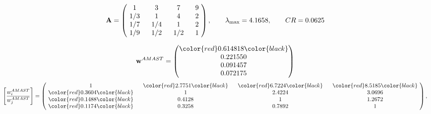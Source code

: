 \begin{example}
\begin{equation*}
\mathbf{A} =
\begin{pmatrix}
$\,\,$ 1 $\,\,$ & $\,\,$3$\,\,$ & $\,\,$7$\,\,$ & $\,\,$9 $\,\,$ \\
$\,\,$ 1/3$\,\,$ & $\,\,$ 1 $\,\,$ & $\,\,$4$\,\,$ & $\,\,$2 $\,\,$ \\
$\,\,$ 1/7$\,\,$ & $\,\,$ 1/4$\,\,$ & $\,\,$ 1 $\,\,$ & $\,\,$2 $\,\,$ \\
$\,\,$ 1/9$\,\,$ & $\,\,$ 1/2$\,\,$ & $\,\,$ 1/2$\,\,$ & $\,\,$ 1  $\,\,$ \\
\end{pmatrix},
\qquad
\lambda_{\max} =
4.1658,
\qquad
CR = 0.0625
\end{equation*}

\begin{equation*}
\mathbf{w}^{AMAST} =
\begin{pmatrix}
\color{red} 0.614818\color{black} \\
0.221550\\
0.091457\\
0.072175
\end{pmatrix}\end{equation*}
\begin{equation*}
\left[ \frac{{w}^{AMAST}_i}{{w}^{AMAST}_j} \right] =
\begin{pmatrix}
$\,\,$ 1 $\,\,$ & $\,\,$\color{red} 2.7751\color{black} $\,\,$ & $\,\,$\color{red} 6.7224\color{black} $\,\,$ & $\,\,$\color{red} 8.5185\color{black} $\,\,$ \\
$\,\,$\color{red} 0.3604\color{black} $\,\,$ & $\,\,$ 1 $\,\,$ & $\,\,$2.4224$\,\,$ & $\,\,$3.0696  $\,\,$ \\
$\,\,$\color{red} 0.1488\color{black} $\,\,$ & $\,\,$0.4128$\,\,$ & $\,\,$ 1 $\,\,$ & $\,\,$1.2672 $\,\,$ \\
$\,\,$\color{red} 0.1174\color{black} $\,\,$ & $\,\,$0.3258$\,\,$ & $\,\,$0.7892$\,\,$ & $\,\,$ 1  $\,\,$ \\
\end{pmatrix},
\end{equation*}


\end{example}
